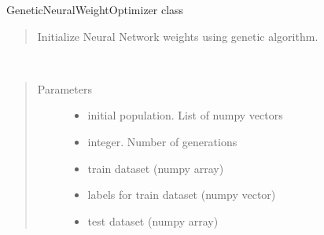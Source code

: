 \documentclass[letterpaper,10pt,english]{sphinxmanual}
\begin{document}
\begin{fulllineitems}
\label{\detokenize{index:genetic_optimizer.GeneticNeuralWeightOptimizer}}
GeneticNeuralWeightOptimizer class
\begin{quote}

Initialize Neural Network weights using genetic algorithm.
\end{quote}

\begin{fulllineitems}
\label{\detokenize{index:genetic_optimizer.GeneticNeuralWeightOptimizer.GA}}~\begin{quote}\begin{description}
\item[{Parameters}] \leavevmode\begin{itemize}
\item {} 
 \textendash{} initial population. List of numpy vectors

\item {} 
 \textendash{} integer. Number of generations

\item {} 
 \textendash{} train dataset (numpy array)

\item {} 
 \textendash{} labels for train dataset (numpy vector)

\item {} 
 \textendash{} test dataset (numpy array)


\end{itemize}
\end{description}
\end{quote}
\end{fulllineitems}
\end{fulllineitems}
\end{document}
